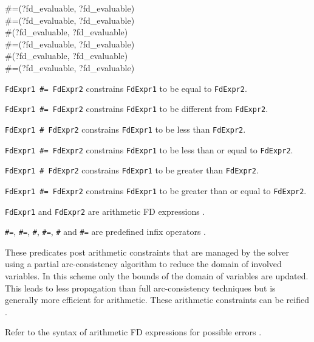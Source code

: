 \begin{TemplatesOneCol}
\#=(?fd\_evaluable, ?fd\_evaluable)\\
\#{\bs}=(?fd\_evaluable, ?fd\_evaluable)\\
\#{\lt}(?fd\_evaluable, ?fd\_evaluable)\\
\#={\lt}(?fd\_evaluable, ?fd\_evaluable)\\
\#{\gt}(?fd\_evaluable, ?fd\_evaluable)\\
\#{\gt}=(?fd\_evaluable, ?fd\_evaluable)

\end{TemplatesOneCol}

\Description

\texttt{FdExpr1 \#= FdExpr2} constrains \texttt{FdExpr1} to be
equal to \texttt{FdExpr2}.

\texttt{FdExpr1 \#{\bs}= FdExpr2} constrains \texttt{FdExpr1}
to be different from \texttt{FdExpr2}.

\texttt{FdExpr1 \#{\lt} FdExpr2} constrains \texttt{FdExpr1} to
be less than \texttt{FdExpr2}.

\texttt{FdExpr1 \#={\lt} FdExpr2} constrains \texttt{FdExpr1}
to be less than or equal to \texttt{FdExpr2}.

\texttt{FdExpr1 \#{\gt} FdExpr2} constrains \texttt{FdExpr1} to
be greater than \texttt{FdExpr2}.

\texttt{FdExpr1 \#{\gt}= FdExpr2} constrains \texttt{FdExpr1}
to be greater than or equal to \texttt{FdExpr2}.

\texttt{FdExpr1} and \texttt{FdExpr2} are arithmetic FD expressions
.

\texttt{\#=}, \texttt{\#{\bs}=}, \texttt{\#{\lt}}, \texttt{\#={\lt}},
\texttt{\#{\gt}} and \texttt{\#{\gt}=} are predefined infix operators
.

These predicates post arithmetic constraints that are managed by the solver
using a partial arc-consistency algorithm to reduce the domain of involved
variables. In this scheme only the bounds of the domain of variables are
updated. This leads to less propagation than full arc-consistency techniques
 but is generally more efficient for
arithmetic. These arithmetic constraints can be reified .

\Errors

Refer to the syntax of arithmetic FD expressions for possible errors
.

